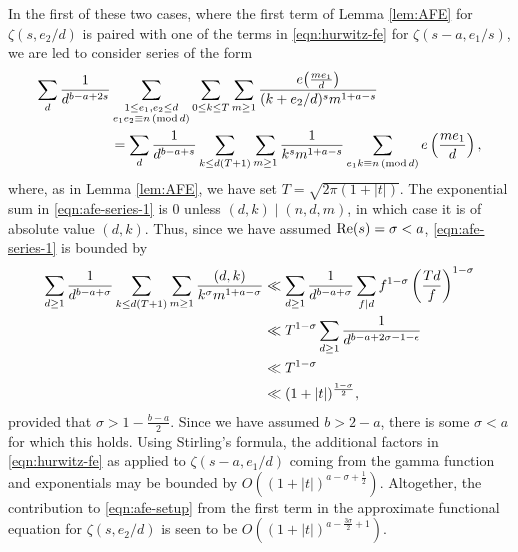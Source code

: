 \documentclass[12pt]{amsart}
\numberwithin{equation}{section}
\numberwithin{theorem}{section}
\renewcommand\Re{\textnormal{Re}}
\renewcommand{\pmod}[1]{\,\left(\mathrm{mod}\,#1\right)}
\begin{document}
In the first of these two cases, where the first term of Lemma \ref{lem:AFE} for $\zeta(s,e_2/d)$ is paired with one of the terms in \eqref{eqn:hurwitz-fe} for $\zeta(s-a,e_1/s)$, we are led to consider series of the form
\begin{align}\label{eqn:afe-series-1}
\sum_d \frac{1}{d^{b-a+2s}} &\sum_{\substack{ 1 \leq e_1,e_2 \leq d \\ e_1e_2 \equiv n\pmod{d}}} \sum_{0 \leq k \leq T} \sum_{m \geq 1} \frac{e\big(\frac{me_1}{d}\big)}{(k+e_2/d)^s m^{1+a-s}} \\
	\notag & = \sum_d \frac{1}{d^{b-a+s}} \sum_{k \leq d(T+1)} \sum_{m \geq 1} \frac{1}{k^s m^{1+a-s}} \sum_{e_1 k \equiv n \pmod{d}} e\left( \frac{me_1}{d}\right),
\end{align}
where, as in Lemma \ref{lem:AFE}, we have set $T = \sqrt{2\pi(1+|t|)}$.  The exponential sum in \eqref{eqn:afe-series-1} is $0$ unless $(d,k) \mid (n,d,m)$, in which case it is of absolute value $(d,k)$.  Thus, since we have assumed $\Re(s)=\sigma < a$, \eqref{eqn:afe-series-1} is bounded by
\begin{align}\label{eqn:afe-bound-1}
\sum_{d\geq 1} \frac{1}{d^{b-a+\sigma}} \sum_{k \leq d(T+1)} \sum_{m \geq 1} \frac{(d,k)}{k^\sigma m^{1+a-\sigma}}
	&\ll \sum_{d \geq 1} \frac{1}{d^{b-a+\sigma}} \sum_{f \mid d} f^{1-\sigma} \left(\frac{Td}{f}\right)^{1-\sigma} \\
	\notag &\ll T^{1-\sigma} \sum_{d \geq 1} \frac{1}{d^{b-a+2\sigma-1-\epsilon}} \\
	\notag &\ll T^{1-\sigma} \\
	\notag &\ll (1+|t|)^{\frac{1-\sigma}{2}},
\end{align}
provided that 
$
	\sigma  > 1 - \frac{b-a}{2}.
$  
Since we have assumed $b>2-a$, there is some $\sigma < a$ for which this holds.  Using Stirling's formula, the additional factors in \eqref{eqn:hurwitz-fe} 
as applied to $\zeta(s - a, e_1/d)$
coming from the gamma function and exponentials may be bounded by $O((1+|t|)^{a-\sigma+\frac{1}{2}})$.  Altogether, the contribution to \eqref{eqn:afe-setup} from the first term in the approximate functional equation for $\zeta(s,e_2/d)$ is seen to be $O((1+|t|)^{a-\frac{3\sigma}{2}+1})$. 
\end{document}
